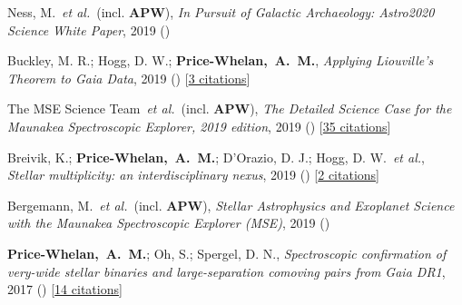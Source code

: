 \item[{\color{deemph}\scriptsize6}]Ness, M.~\textit{et al.}~(incl. \textbf{APW}), \textit{In Pursuit of Galactic Archaeology: Astro2020 Science White Paper}, 2019 ()

\item[{\color{deemph}\scriptsize5}]Buckley, M. R.; Hogg, D. W.; \textbf{Price-Whelan,~A.~M.}, \textit{Applying Liouville's Theorem to Gaia Data}, 2019 () [\href{http://adsabs.harvard.edu/abs/2019arXiv190700987B}{3 citations}]

\item[{\color{deemph}\scriptsize4}]The MSE Science Team~\textit{et al.}~(incl. \textbf{APW}), \textit{The Detailed Science Case for the Maunakea Spectroscopic Explorer, 2019 edition}, 2019 () [\href{http://adsabs.harvard.edu/abs/2019arXiv190404907T}{35 citations}]

\item[{\color{deemph}\scriptsize3}]Breivik, K.; \textbf{Price-Whelan,~A.~M.}; D'Orazio, D. J.; Hogg, D. W.~\textit{et al.}, \textit{Stellar multiplicity: an interdisciplinary nexus}, 2019 () [\href{http://adsabs.harvard.edu/abs/2019arXiv190305094B}{2 citations}]

\item[{\color{deemph}\scriptsize2}]Bergemann, M.~\textit{et al.}~(incl. \textbf{APW}), \textit{Stellar Astrophysics and Exoplanet Science with the Maunakea Spectroscopic Explorer (MSE)}, 2019 ()

\item[{\color{deemph}\scriptsize1}]\textbf{Price-Whelan,~A.~M.}; Oh, S.; Spergel, D. N., \textit{Spectroscopic confirmation of very-wide stellar binaries and large-separation comoving pairs from Gaia DR1}, 2017 () [\href{http://adsabs.harvard.edu/abs/2017arXiv170903532P}{14 citations}]